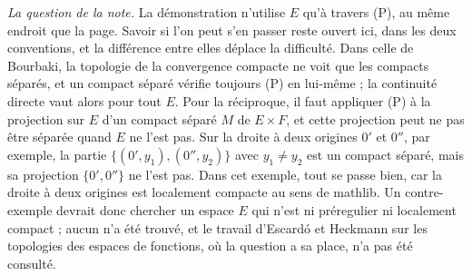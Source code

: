 \emph{La question de la note.} La démonstration n'utilise $E$ qu'à travers (P), au même endroit que la page. Savoir si l'on peut s'en passer reste ouvert ici, dans les deux conventions, et la différence entre elles déplace la difficulté. Dans celle de Bourbaki, la topologie de la convergence compacte ne voit que les compacts séparés, et un compact séparé vérifie toujours (P) en lui-même ; la continuité directe vaut alors pour tout $E$. Pour la réciproque, il faut appliquer (P) à la projection sur $E$ d'un compact séparé $M$ de $E \times F$, et cette projection peut ne pas être séparée quand $E$ ne l'est pas. Sur la droite à deux origines $0'$ et $0''$, par exemple, la partie $\{(0', y_1), (0'', y_2)\}$ avec $y_1 \neq y_2$ est un compact séparé, mais sa projection $\{0', 0''\}$ ne l'est pas. Dans cet exemple, tout se passe bien, car la droite à deux origines est localement compacte au sens de mathlib. Un contre-exemple devrait donc chercher un espace $E$ qui n'est ni préregulier ni localement compact ; aucun n'a été trouvé, et le travail d'Escardó et Heckmann sur les topologies des espaces de fonctions, où la question a sa place, n'a pas été consulté.
